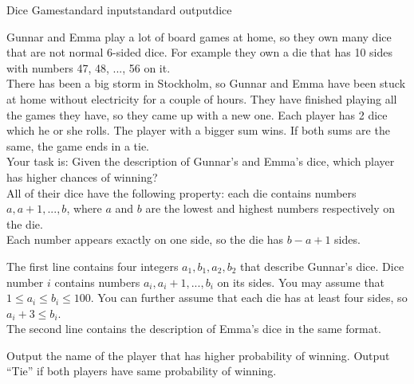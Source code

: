 \begin{problem}{Dice Game}{standard input}{standard output}{dice}

Gunnar and Emma play a lot of board games at home, so they own many dice that are not normal 6-sided
dice. For example they own a die that has 10 sides with numbers 47, 48, ..., 56 on it.\\

There has been a big storm in Stockholm, so Gunnar and Emma have been stuck at home without
electricity for a couple of hours. They have finished playing all the games they have, so they came
up with a new one. Each player has 2 dice which he or she rolls. The player with a bigger sum wins.
If both sums are the same, the game ends in a tie.\\

Your task is: Given the description of Gunnar’s and Emma’s dice, which player has higher chances of
winning?\\

All of their dice have the following property: each die contains numbers $a, a + 1, . . . , b$,
where $a$ and $b$ are the lowest and highest numbers respectively on the die.\\

Each number appears exactly on one side, so the die has $b - a + 1$ sides.

\InputFile

The first line contains four integers $a_1, b_1, a_2, b_2$ that describe Gunnar's dice.
Dice number $i$ contains numbers $a_i, a_i + 1, . . . , b_i$ on its sides. You may assume
that $1 \leq a_i \leq b_i \leq 100$. You can further assume that each die has at least four sides,
so $a_i + 3 \leq b_i$.\\

The second line contains the description of Emma's dice in the same format.\\

\OutputFile

Output the name of the player that has higher probability of winning. Output ``Tie'' if both players
have same probability of winning.\\

\Example

\begin{example}
%
%
%
\end{example}

\end{problem}
